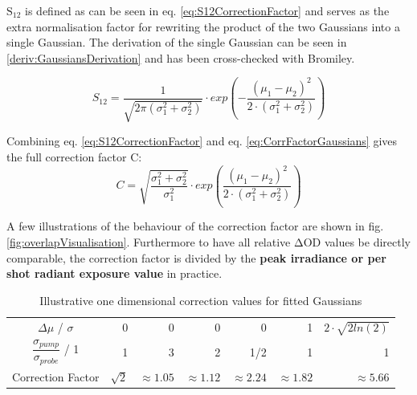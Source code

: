 \documentclass[twoside,openright]{scrreprt}
\begin{document}
{$\mathrm{S_{12}}$ is defined as can be seen in eq. \ref{eq:S12CorrectionFactor} and serves as the extra normalisation factor for rewriting the product of the two Gaussians into a single Gaussian. The derivation of the single Gaussian can be seen in \ref{deriv:GaussiansDerivation} and has been cross-checked with Bromiley.\cite{Bromiley2014}

\begin{equation}\label{eq:S12CorrectionFactor}
S_{12} = \dfrac{1}{\sqrt{2\pi\left(\sigma_1^2+\sigma_2^2\right)}}\cdot exp\left(-\dfrac{\left(\mu_1 - \mu_2\right)^2}{2\cdot \left(\sigma_1^2+\sigma_2^2\right)}\right)
\end{equation}

Combining eq. \ref{eq:S12CorrectionFactor} and eq. \ref{eq:CorrFactorGaussians} gives the full correction factor C:
\begin{equation}\label{eq:fullCorrectionFactor}
C = \sqrt{\frac{\sigma_1^2+\sigma_2^2}{\sigma_1^2}}\cdot exp \left(\frac{\left(\mu_1-\mu_2\right)^2}{2\cdot \left(\sigma_1^2+\sigma_2^2\right)}\right)
\end{equation}

A few illustrations of the behaviour of the correction factor are shown in fig. \ref{fig:overlapVisualisation}. Furthermore to have all relative $\mathrm{\Delta OD}$ values be directly comparable, the correction factor is divided by the \textbf{peak irradiance or per shot radiant exposure value} in practice.

\begin{table}[h]
\caption{Illustrative one dimensional correction values for fitted Gaussians}
\centering
\begin{tabular}{c|rrrrrr}\toprule
$\Delta \mu$ / $\sigma$                     & 0          & 0             & 0              & 0             & 1              & $2\cdot\sqrt{2 ln(2)}$ \\
$\dfrac{\sigma_{pump}}{\sigma_{probe}}$ / 1 & 1          & 3             & 2              & 1/2           & 1              & 1                      \\
Correction Factor                           & $\sqrt{2}$ & $\approx1.05$ & $\approx 1.12$ & $\approx 2.24$ & $\approx 1.82$ & $\approx 5.66$ \\ \bottomrule       
\end{tabular}
\end{table}


}
\end{document}
